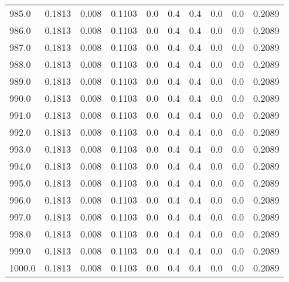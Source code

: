 \begin{longtable}{lrrrrrrrrr}
985.0 & 0.1813 & 0.008 & 0.1103 & 0.0 & 0.4 & 0.4 & 0.0 & 0.0 & 0.2089 \\
986.0 & 0.1813 & 0.008 & 0.1103 & 0.0 & 0.4 & 0.4 & 0.0 & 0.0 & 0.2089 \\
987.0 & 0.1813 & 0.008 & 0.1103 & 0.0 & 0.4 & 0.4 & 0.0 & 0.0 & 0.2089 \\
988.0 & 0.1813 & 0.008 & 0.1103 & 0.0 & 0.4 & 0.4 & 0.0 & 0.0 & 0.2089 \\
989.0 & 0.1813 & 0.008 & 0.1103 & 0.0 & 0.4 & 0.4 & 0.0 & 0.0 & 0.2089 \\
990.0 & 0.1813 & 0.008 & 0.1103 & 0.0 & 0.4 & 0.4 & 0.0 & 0.0 & 0.2089 \\
991.0 & 0.1813 & 0.008 & 0.1103 & 0.0 & 0.4 & 0.4 & 0.0 & 0.0 & 0.2089 \\
992.0 & 0.1813 & 0.008 & 0.1103 & 0.0 & 0.4 & 0.4 & 0.0 & 0.0 & 0.2089 \\
993.0 & 0.1813 & 0.008 & 0.1103 & 0.0 & 0.4 & 0.4 & 0.0 & 0.0 & 0.2089 \\
994.0 & 0.1813 & 0.008 & 0.1103 & 0.0 & 0.4 & 0.4 & 0.0 & 0.0 & 0.2089 \\
995.0 & 0.1813 & 0.008 & 0.1103 & 0.0 & 0.4 & 0.4 & 0.0 & 0.0 & 0.2089 \\
996.0 & 0.1813 & 0.008 & 0.1103 & 0.0 & 0.4 & 0.4 & 0.0 & 0.0 & 0.2089 \\
997.0 & 0.1813 & 0.008 & 0.1103 & 0.0 & 0.4 & 0.4 & 0.0 & 0.0 & 0.2089 \\
998.0 & 0.1813 & 0.008 & 0.1103 & 0.0 & 0.4 & 0.4 & 0.0 & 0.0 & 0.2089 \\
999.0 & 0.1813 & 0.008 & 0.1103 & 0.0 & 0.4 & 0.4 & 0.0 & 0.0 & 0.2089 \\
1000.0 & 0.1813 & 0.008 & 0.1103 & 0.0 & 0.4 & 0.4 & 0.0 & 0.0 & 0.2089 \\
\end{longtable}